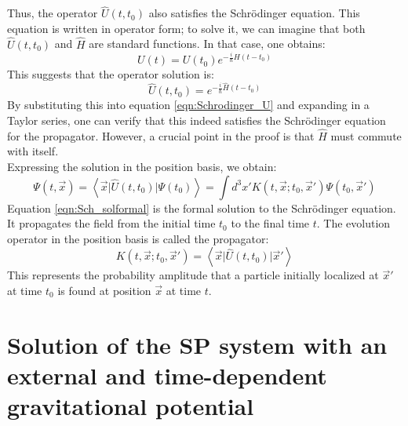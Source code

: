 \documentclass[12pt]{article}
\newcommand{\braket}[2]{\left< #1 | #2 \right>}
\begin{document}
Thus, the operator $\hat{U}(t,t_0)$ also satisfies the Schrödinger equation. This equation is written in operator form; to solve it, we can imagine that both $\hat{U}(t,t_0)$ and $\hat{H}$ are standard functions. In that case, one obtains:
\begin{equation}
    U(t)=U(t_0)e^{-\frac{i}{\hbar}H(t-t_0)}
\end{equation}
This suggests that the operator solution is:
\begin{equation}
    \hat{U}(t,t_0)=e^{-\frac{i}{\hbar}\hat{H}(t-t_0)}
\end{equation}
By substituting this into equation \ref{eqn:Schrodinger_U} and expanding in a Taylor series, one can verify that this indeed satisfies the Schrödinger equation for the propagator. However, a crucial point in the proof is that $\hat{H}$ must commute with itself. \\
Expressing the solution in the position basis, we obtain:
\begin{equation}
\label{eqn:Sch_solformal}
    \Psi(t,\vec{x})=\braket{\vec{x}}{\hat{U}(t,t_0)\bigg|\Psi(t_0)}=\int d^3 x' K(t,\vec{x};t_0,\vec{x}')\Psi(t_0,\vec{x}')
\end{equation}
Equation \ref{eqn:Sch_solformal} is the formal solution to the Schrödinger equation. It propagates the field from the initial time $t_0$ to the final time $t$. The evolution operator in the position basis is called the propagator:
\begin{equation}
    K(t,\vec{x};t_0,\vec{x}')=\braket{\vec{x}}{\hat{U}(t,t_0)\bigg|\vec{x}'}
\end{equation}
This represents the probability amplitude that a particle initially localized at $\vec{x}'$ at time $t_0$ is found at position $\vec{x}$ at time $t$.

\section*{Solution of the SP system with an external and time-dependent gravitational potential \label{sec2}}
\end{document}
